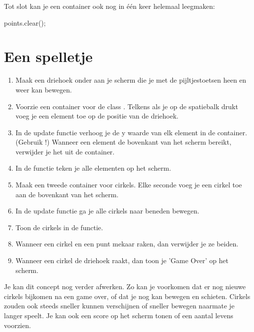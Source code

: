 Tot slot kan je een container ook nog in \'e\'en keer helemaal leegmaken:

\begin{code}
points.clear();
\end{code}

\section{Een spelletje}

\begin{enumerate}
\item Maak een driehoek onder aan je scherm die je met de pijltjestoetsen heen en weer kan bewegen.
\item Voorzie een container voor de class . Telkens als je op de spatiebalk drukt voeg je een element toe op de positie van de driehoek.
\item In de update functie verhoog je de y waarde van elk element in de container. (Gebruik !) Wanneer een element de bovenkant van het scherm bereikt, verwijder je het uit de container.
\item In de  functie teken je alle elementen op het scherm.
\item Maak een tweede container voor cirkels. Elke seconde voeg je een cirkel toe aan de bovenkant van het scherm.
\item In de update functie ga je alle cirkels naar beneden bewegen.
\item Toon de cirkels in de  functie.
\item Wanneer een cirkel en een punt mekaar raken, dan verwijder je ze beiden.
\item Wanneer een cirkel de driehoek raakt, dan toon je 'Game Over' op het scherm.
\end{enumerate}

Je kan dit concept nog verder afwerken. Zo kan je voorkomen dat er nog nieuwe cirkels bijkomen na een game over, of dat je nog kan bewegen en schieten. Cirkels zouden ook steeds sneller kunnen verschijnen of sneller bewegen naarmate je langer speelt. Je kan ook een score op het scherm tonen of een aantal levens voorzien.
